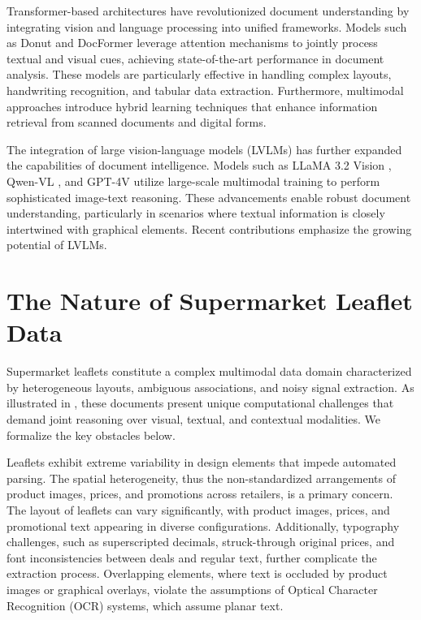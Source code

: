 \documentclass[11pt]{article}
\begin{document}
Transformer-based architectures \cite{vaswani2017, dosovitskiy2021} have revolutionized document understanding by integrating vision and language processing into unified frameworks. Models such as Donut \cite{kim2022} and DocFormer \cite{appalaraju2021} leverage attention mechanisms to jointly process textual and visual cues, achieving state-of-the-art performance in document analysis. These models are particularly effective in handling complex layouts, handwriting recognition, and tabular data extraction. Furthermore, multimodal approaches \cite{peng2022, li2021} introduce hybrid learning techniques that enhance information retrieval from scanned documents and digital forms.

The integration of large vision-language models (LVLMs) has further expanded the capabilities of document intelligence. Models such as LLaMA 3.2 Vision \cite{touvron2023}, Qwen-VL \cite{qwen2025}, and GPT-4V \cite{dai2023} utilize large-scale multimodal training to perform sophisticated image-text reasoning. These advancements enable robust document understanding, particularly in scenarios where textual information is closely intertwined with graphical elements. Recent contributions \cite{li2024, wei2024} emphasize the growing potential of LVLMs. 

\section{The Nature of Supermarket Leaflet Data}  
Supermarket leaflets constitute a complex multimodal data domain characterized by heterogeneous layouts, ambiguous associations, and noisy signal extraction. As illustrated in , these documents present unique computational challenges that demand joint reasoning over visual, textual, and contextual modalities. We formalize the key obstacles below.

Leaflets exhibit extreme variability in design elements that impede automated parsing. The spatial heterogeneity, thus the non-standardized arrangements of product images, prices, and promotions across retailers, is a primary concern. The layout of leaflets can vary significantly, with product images, prices, and promotional text appearing in diverse configurations. Additionally, typography challenges, such as superscripted decimals, struck-through original prices, and font inconsistencies between deals and regular text, further complicate the extraction process. Overlapping elements, where text is occluded by product images or graphical overlays, violate the assumptions of Optical Character Recognition (OCR) systems, which assume planar text.
\end{document}
